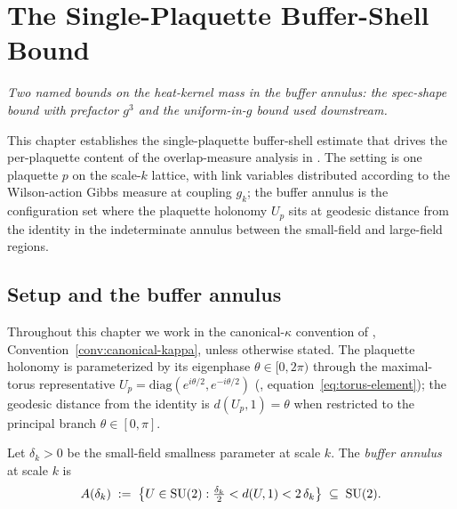 %

\chapter{The Single-Plaquette Buffer-Shell Bound}
\label{ch:buffer-shell}

\noindent\emph{Two named bounds on the heat-kernel mass in the
buffer annulus: the spec-shape bound with prefactor $g^3$ and the
uniform-in-$g$ bound used downstream.}

This chapter establishes the single-plaquette buffer-shell estimate
that drives the per-plaquette content of the overlap-measure
analysis in .  The setting is one
plaquette $p$ on the scale-$k$ lattice, with link variables
distributed according to the Wilson-action Gibbs measure at coupling
$g_k$; the buffer annulus is the configuration set where the
plaquette holonomy $U_p$ sits at geodesic distance from the identity
in the indeterminate annulus between the small-field and large-field
regions.

\section{Setup and the buffer annulus}
\label{sec:buffer-setup}

Throughout this chapter we work in the canonical-$\kappa$ convention
of , Convention~\ref{conv:canonical-kappa},
unless otherwise stated.  The plaquette holonomy is parameterized
by its eigenphase $\theta \in [0, 2\pi)$ through the maximal-torus
representative
$U_p = \mathrm{diag}(e^{i\theta/2}, e^{-i\theta/2})$
(, equation~\eqref{eq:torus-element}); the
geodesic distance from the identity is $d(U_p, 1) = \theta$ when
restricted to the principal branch $\theta \in [0, \pi]$.

%

\begin{definition}
\label{def:buffer-annulus}
Let $\delta_k > 0$ be the small-field smallness parameter at scale
$k$.  The \emph{buffer annulus} at scale $k$ is
\begin{equation}
  \label{eq:buffer-annulus}
  A(\delta_k) \;:=\; \bigl\{ U \in \mathrm{SU}(2) : \tfrac{\delta_k}{2} < d(U, 1) < 2\,\delta_k \bigr\}
  \;\subseteq\; \mathrm{SU}(2).
\end{equation}
\end{definition}

